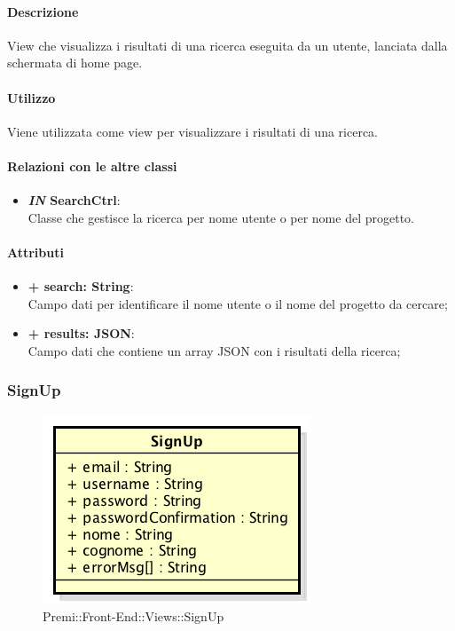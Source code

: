 	\paragraph{Descrizione}
	View che visualizza i risultati di una ricerca eseguita da un utente, lanciata dalla schermata di home page.
	
	\paragraph{Utilizzo}
	Viene utilizzata come view per visualizzare i risultati di una ricerca.
	
	\paragraph{Relazioni con le altre classi}
	\begin{itemize}
		\item \textbf{\textit{IN} SearchCtrl}:\\
		Classe che gestisce la ricerca per nome utente o per nome del progetto.
	\end{itemize}
	
	\paragraph{Attributi}
	\begin{itemize}
		\item \textbf{+ search: String}:\\
		Campo dati per identificare il nome utente o il nome del progetto da cercare;
		\item \textbf{+ results: JSON}:\\
		Campo dati che contiene un array JSON con i risultati della ricerca;
	\end{itemize}
\newpage
	
	
\subsubsection{SignUp}
	\begin{figure}[h]
		\centering
		\includegraphics[width=0.3\linewidth]{img/premi_front_end_views_signup}
		\caption[Premi::Front-End::Views::SignUp]{Premi::Front-End::Views::SignUp}
	\end{figure}
	
